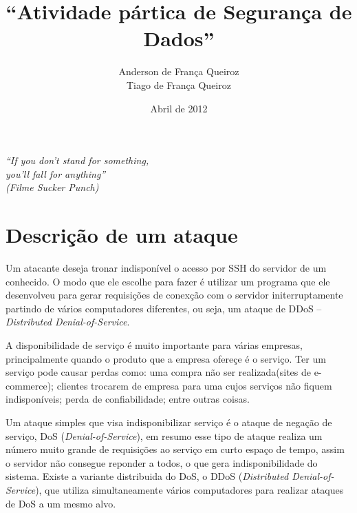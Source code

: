 \documentclass[12pt]{abnt}
\title{``Atividade pártica de Segurança de Dados''}
\author{Anderson de França Queiroz\\
Tiago de França Queiroz}
\date{Abril de 2012}
\begin{document}
\sloppy

\maketitle

\begin{titlepage}

  \vspace{6cm}

  \begin{flushleft}
    \sffamily\slshape
    ``If you don't stand for something,\\
	you'll fall for anything''\\
	(Filme Sucker Punch)
   
    \vspace{1cm}
    
    \end{flushleft}

\end{titlepage}

\tableofcontents
\clearpage

\chapter{Descrição de um ataque}

Um atacante deseja tronar indisponível o acesso por SSH do servidor de um conhecido. O modo que ele escolhe para fazer é utilizar
um programa que ele desenvolveu para gerar requisições de conexção com o servidor initerruptamente partindo de vários computadores
diferentes, ou seja, um ataque de DDoS -- \textit{Distributed Denial-of-Service}.

A disponibilidade de serviço é muito importante para várias empresas, principalmente quando o produto que a empresa ofereçe é o serviço.
Ter um serviço pode causar perdas como: uma compra não ser realizada(sites de e-commerce); clientes trocarem de empresa para uma cujos
serviços não fiquem indisponíveis; perda de confiabilidade; entre outras coisas.

Um ataque simples
que visa indisponibilizar serviço é o ataque de negação de serviço, DoS (\textit{Denial-of-Service}), 
em resumo esse tipo de ataque realiza um número muito grande
de requisições ao serviço em curto espaço de tempo, assim o servidor não consegue reponder a todos, o que gera indisponibilidade do sistema.
Existe a variante distribuida do DoS, o DDoS (\textit{Distributed Denial-of-Service}), 
que utiliza simultaneamente vários computadores para realizar ataques de DoS a um mesmo alvo.
\end{document}
